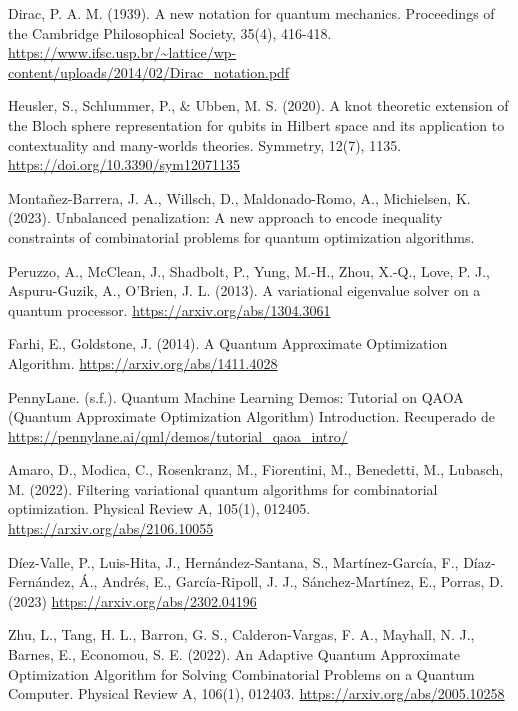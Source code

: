 \begin{thebibliography}{a}
Dirac, P. A. M. (1939). A new notation for quantum mechanics. Proceedings of the Cambridge Philosophical Society, 35(4), 416-418. \url{https://www.ifsc.usp.br/~lattice/wp-content/uploads/2014/02/Dirac_notation.pdf}

Heusler, S., Schlummer, P., \& Ubben, M. S. (2020). A knot theoretic extension of the Bloch sphere representation for qubits in Hilbert space and its application to contextuality and many-worlds theories. Symmetry, 12(7), 1135. \url{https://doi.org/10.3390/sym12071135}

Montañez-Barrera, J. A., Willsch, D., Maldonado-Romo, A., Michielsen, K. (2023). Unbalanced penalization: A new approach to encode inequality constraints of combinatorial problems for quantum optimization algorithms.

Peruzzo, A., McClean, J., Shadbolt, P., Yung, M.-H., Zhou, X.-Q., Love, P. J., Aspuru-Guzik, A., O’Brien, J. L. (2013). A variational eigenvalue solver on a quantum processor. \url{https://arxiv.org/abs/1304.3061}

Farhi, E., Goldstone, J. (2014). A Quantum Approximate Optimization Algorithm. \url{https://arxiv.org/abs/1411.4028}

PennyLane. (s.f.). Quantum Machine Learning Demos: Tutorial on QAOA (Quantum Approximate Optimization Algorithm) Introduction. Recuperado de \url{https://pennylane.ai/qml/demos/tutorial_qaoa_intro/}

Amaro, D., Modica, C., Rosenkranz, M., Fiorentini, M., Benedetti, M., Lubasch, M. (2022). Filtering variational quantum algorithms for combinatorial optimization. Physical Review A, 105(1), 012405. \url{https://arxiv.org/abs/2106.10055}

Díez-Valle, P., Luis-Hita, J., Hernández-Santana, S., Martínez-García, F., Díaz-Fernández, Á., Andrés, E., García-Ripoll, J. J., Sánchez-Martínez, E., Porras, D. (2023)
\url{https://arxiv.org/abs/2302.04196}

Zhu, L., Tang, H. L., Barron, G. S., Calderon-Vargas, F. A., Mayhall, N. J., Barnes, E., Economou, S. E. (2022). An Adaptive Quantum Approximate Optimization Algorithm for Solving Combinatorial Problems on a Quantum Computer. Physical Review A, 106(1), 012403. \url{https://arxiv.org/abs/2005.10258}


\end{thebibliography}
